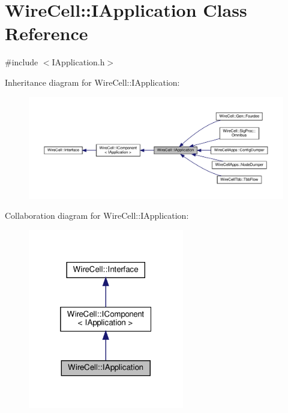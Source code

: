 \hypertarget{class_wire_cell_1_1_i_application}{}\section{Wire\+Cell\+:\+:I\+Application Class Reference}
\label{class_wire_cell_1_1_i_application}


{\ttfamily \#include $<$I\+Application.\+h$>$}



Inheritance diagram for Wire\+Cell\+:\+:I\+Application\+:
\nopagebreak
\begin{figure}[H]
\begin{center}
\leavevmode
\includegraphics[width=350pt]{class_wire_cell_1_1_i_application__inherit__graph}
\end{center}
\end{figure}


Collaboration diagram for Wire\+Cell\+:\+:I\+Application\+:
\nopagebreak
\begin{figure}[H]
\begin{center}
\leavevmode
\includegraphics[width=193pt]{class_wire_cell_1_1_i_application__coll__graph}
\end{center}
\end{figure}
